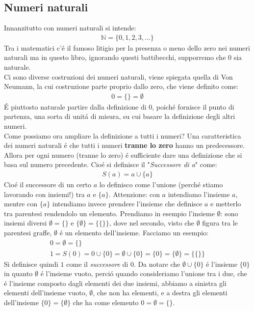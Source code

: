 \documentclass[twoside]{article} %
\begin{document}
	 \subsection{Numeri naturali}
	Innanzitutto con numeri naturali si intende:
	 \begin{gather*}
	 	\mathbb{N}=\{0,1,2,3, ...\}
	 \end{gather*}
	 Tra i matematici c'\'e il famoso litigio per la presenza o meno dello zero nei numeri naturali ma in questo libro, ignorando questi battibecchi, supporremo che 0 sia naturale.\\
	 Ci sono diverse costruzioni dei numeri naturali, viene spiegata quella di Von Neumann, la cui costruzione parte proprio dallo zero, che viene definito come:
	 \begin{gather*}
	 	0=\{\}=\emptyset
	 \end{gather*}
	 \'E piuttosto naturale partire dalla definizione di $0$, poich\'e fornisce il punto di partenza, una sorta di unit\'a di misura, su cui basare la definizione degli altri numeri.\\
	 Come possiamo ora ampliare la definizione a tutti i numeri? Una caratteristica dei numeri naturali \'e che tutti i numeri \textbf{tranne lo zero} hanno un predecessore. Allora per ogni numero (tranne lo zero) \'e sufficiente dare una definizione che si basa sul numero precedente. Cio\'e si definisce il "\textit{Successore di a}" come:
	 \begin{gather*}
	 	S(a)=a\cup \{a\}
	 \end{gather*}
	 Cio\'e il successore di un certo $a$ lo definisco come l'unione (perch\'e stiamo lavorando con insiemi!) tra $a$ e $\{a\}$. Attenzione: con $a$ intendiamo l'insieme $a$, mentre con $\{a\}$ intendiamo invece prendere l'insieme che definisce $a$ e metterlo tra parentesi rendendolo un elemento. Prendiamo in esempio l'insieme $\emptyset$: sono insiemi diversi $\emptyset=\{\}$ e $\{\emptyset\}=\{\{\}\}$, dove nel secondo, visto che $\emptyset$ figura tra le parentesi graffe, $\emptyset$ \'e un elemento dell'insieme. Facciamo un esempio:
	 \begin{gather*}
	 	0=\emptyset=\{\}\\
	 	1=S(0)=0\cup \{0\}=\emptyset\cup \{0\}=\{0\}=\{\emptyset\}=\{\{\}\}
	 \end{gather*}
	 Si definisce quindi $1$ come il \textit{successore} di $0$. Da notare che $\emptyset\cup\{0\}$ \'e l'insieme $\{0\}$ in quanto $\emptyset$ \'e l'insieme vuoto, perci\'o quando consideriamo l'unione tra i due, che \'e l'insieme composto dagli elementi dei due insiemi, abbiamo a sinistra gli elementi dell'insieme vuoto, $\emptyset$, che non ha elementi, e a destra gli elementi dell'insieme $\{0\}=\{\emptyset\}$ che ha come elemento $0=\emptyset=\{\}$. \\
\end{document}
